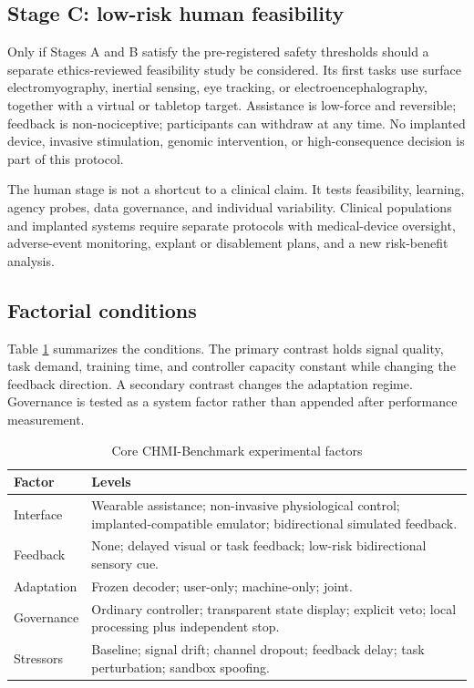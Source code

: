 \documentclass[conference]{IEEEtran}
\begin{document}
\subsection{Stage C: low-risk human feasibility}

Only if Stages A and B satisfy the pre-registered safety thresholds should a separate ethics-reviewed feasibility study be considered. Its first tasks use surface electromyography, inertial sensing, eye tracking, or electroencephalography, together with a virtual or tabletop target. Assistance is low-force and reversible; feedback is non-nociceptive; participants can withdraw at any time. No implanted device, invasive stimulation, genomic intervention, or high-consequence decision is part of this protocol.

The human stage is not a shortcut to a clinical claim. It tests feasibility, learning, agency probes, data governance, and individual variability. Clinical populations and implanted systems require separate protocols with medical-device oversight, adverse-event monitoring, explant or disablement plans, and a new risk-benefit analysis.

\subsection{Factorial conditions}

Table \ref{tab:design} summarizes the conditions. The primary contrast holds signal quality, task demand, training time, and controller capacity constant while changing the feedback direction. A secondary contrast changes the adaptation regime. Governance is tested as a system factor rather than appended after performance measurement.

\begin{table}[t]
\caption{Core CHMI-Benchmark experimental factors}
\label{tab:design}
\centering
\scriptsize
\begin{tabular}{p{}p{}}
\toprule
Factor & Levels\\
\midrule
Interface & Wearable assistance; non-invasive physiological control; implanted-compatible emulator; bidirectional simulated feedback.\\
Feedback & None; delayed visual or task feedback; low-risk bidirectional sensory cue.\\
Adaptation & Frozen decoder; user-only; machine-only; joint.\\
Governance & Ordinary controller; transparent state display; explicit veto; local processing plus independent stop.\\
Stressors & Baseline; signal drift; channel dropout; feedback delay; task perturbation; sandbox spoofing.\\
\bottomrule
\end{tabular}
\end{table}
\end{document}
